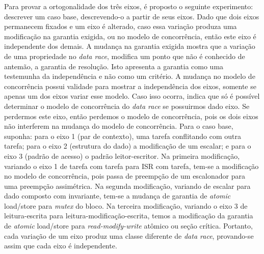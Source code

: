 Para provar a ortogonalidade dos três eixos, é proposto o seguinte experimento: descrever um caso base, descrevendo-o a partir de seus eixos. Dado que dois eixos permanecem fixados e um eixo é alterado, caso essa variação produza uma modificação na garantia exigida, ou no modelo de concorrência, então este eixo é independente dos demais. A mudança na garantia exigida mostra que a variação de uma propriedade no \textit{data race}, modifica um ponto que não é conhecido de antemão, a garantia de resolução. Isto apresenta a garantia como uma testemunha da independência e não como um critério. A mudança no modelo de concorrência possui validade para mostrar a independência dos eixos, somente se apenas um dos eixos variar esse modelo. Caso isso ocorra, indica que só é possível determinar o modelo de concorrência do \textit{data race} se possuirmos dado eixo. Se perdermos este eixo, então perdemos o modelo de concorrência, pois os dois eixos não interferem na mudança do modelo de concorrência. Para o caso base, suponha: para o eixo 1 (par de contexto), uma tarefa conflitando com outra tarefa; para o eixo 2 (estrutura do dado) a modificação de um escalar; e para o eixo 3 (padrão de acesso) o padrão leitor-escritor. Na primeira modificação, variando o eixo 1 de tarefa com tarefa para \ac{ISR} com tarefa, tem-se a modificação no modelo de concorrência, pois passa de preempção de um escalonador para uma preempção assimétrica. Na segunda modificação, variando de escalar para dado composto com invariante, tem-se a mudança de garantia de \textit{atomic} load/store para \textit{mutex} do bloco. Na terceira modificação, variando o eixo 3 de leitura-escrita para leitura-modificação-escrita, temos a modificação da garantia de \textit{atomic} load/store para \textit{read-modify-write} atômico ou seção crítica. Portanto, cada variação de um eixo produz uma classe diferente de \textit{data race}, provando-se assim que cada eixo é independente.

